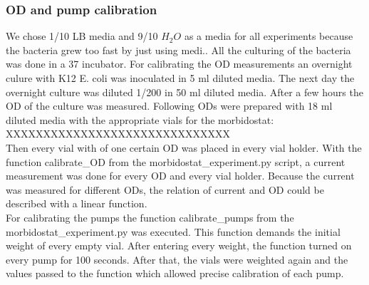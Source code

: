 \subsubsection{OD and pump calibration}
We chose 1/10 LB media and 9/10 $H_2O$ as a media for all experiments because the bacteria grew too fast by just using medi.. All the culturing of the bacteria was done in a 37 \degree \space incubator.  
For calibrating the OD measurements an overnight culure with K12 E. coli was inoculated in 5 ml diluted media. The next day the overnight culture was diluted 1/200 in 50 ml diluted media. After a few hours the OD of the culture was measured. Following ODs were prepared with 18 ml diluted media with the appropriate vials for the morbidostat: XXXXXXXXXXXXXXXXXXXXXXXXXXXXXX\\
Then every vial with of one certain OD was placed in every vial holder. With the function calibrate\_OD from the morbidostat\_experiment.py script, a current measurement was done for every OD and every vial holder. Because the current was measured for different ODs, the relation of current and OD could be described with a linear function. \\
For calibrating the pumps the function calibrate\_pumps from the morbidostat\_experiment.py was executed. This function demands the initial weight of every empty vial. After entering every weight, the function turned on every pump for 100 seconds. After that, the vials were weighted again and the values passed to the function which allowed precise calibration of each pump.
\label{section:OD_calibration}

